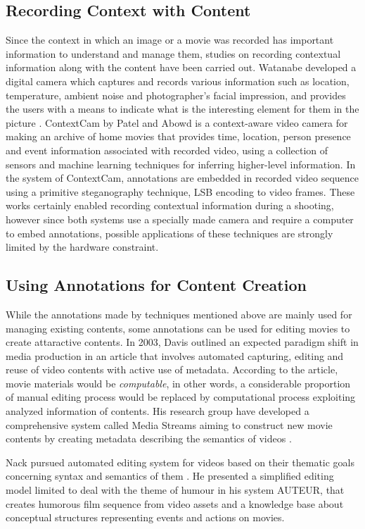 \subsection{Recording Context with Content}
Since the context in which an image or a movie was recorded has important information to understand and manage them, studies on recording contextual information along with the content have been carried out.
Watanabe developed a digital camera which captures and records various information such as location, temperature, ambient noise and photographer's facial impression, and provides the users with a means to indicate what is the interesting element for them in the picture \cite{Watanabe:2007:WDC:1240866.1241073}.
ContextCam by Patel and Abowd \cite{Patel04thecontextcam:} is a context-aware video camera for making an archive of home movies that provides time, location, person presence and event information associated with recorded video, using a collection of sensors and machine learning techniques for inferring higher-level information.
In the system of ContextCam, annotations are embedded in recorded video sequence using a primitive steganography technique, LSB encoding to video frames.
These works certainly enabled recording contextual information during a shooting, however since both systems use a specially made camera and require a computer to embed annotations, possible applications of these techniques are strongly limited by the hardware constraint.

\subsection{Using Annotations for Content Creation}
While the annotations made by techniques mentioned above are mainly used for managing existing contents, some annotations can be used for editing movies to create attaractive contents.
In 2003, Davis outlined an expected paradigm shift in media production in an article \cite{davis2003editing} that involves automated capturing, editing and reuse of video contents with active use of metadata.
According to the article, movie materials would be {\it computable}, in other words, a considerable proportion of manual editing process would be replaced by computational process exploiting analyzed information of contents.
His research group have developed a comprehensive system called Media Streams aiming to construct new movie contents by creating metadata describing the semantics of videos \cite{davis2000media}.

Nack pursued automated editing system for videos based on their thematic goals concerning syntax and semantics of them \cite{nack1997application}.
He presented a simplified editing model limited to deal with the theme of humour in his system AUTEUR, that creates humorous film sequence from video assets and a knowledge base about conceptual structures representing events and actions on movies.
